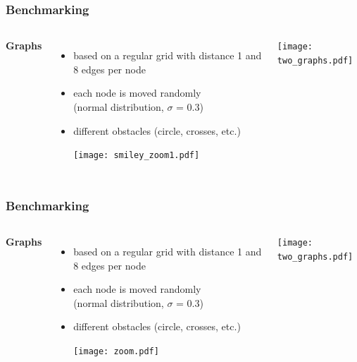 \documentclass{beamer}
\begin{document}
\begin{frame}
\frametitle{Benchmarking}
\begin{columns}[c] %
\textbf{Graphs}
\begin{itemize}
\item based on a regular grid with distance 1 and 8 edges per node
\item each node  is moved randomly\\(normal distribution, $\sigma$ = 0.3)
\item different obstacles (circle, crosses, etc.)
\vspace{10pt}
\begin{center}
	\texttt{[image: smiley\_zoom1.pdf]}
\end{center}
\end{itemize}

\begin{center}
	\texttt{[image: two\_graphs.pdf]}
\end{center}
\end{columns}
\end{frame}

\begin{frame}
\frametitle{Benchmarking}
\begin{columns}[c] %
\textbf{Graphs}
\begin{itemize}
\item based on a regular grid with distance 1 and 8 edges per node
\item each node  is moved randomly\\(normal distribution, $\sigma$ = 0.3)
\item different obstacles (circle, crosses, etc.)
\vspace{10pt}
\begin{center}
	\texttt{[image: zoom.pdf]}
\end{center}
\end{itemize}

\begin{center}
	\texttt{[image: two\_graphs.pdf]}
\end{center}
\end{columns}
\end{frame}
\end{document}
